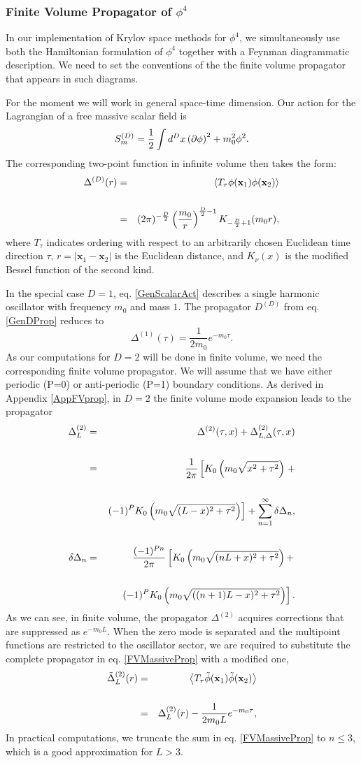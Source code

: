 \documentclass[twocolumn,secnumarabic,amssymb, nobibnotes, aps, prd]{revtex4-2}
\newcommand{\be}{\begin{equation}}
\newcommand{\ee}{\end{equation}}
\newcommand{\bea}{\begin{eqnarray}}
\newcommand{\eea}{\end{eqnarray}}
\begin{document}
\subsubsection{Finite Volume Propagator of $\phi^4$}
In our implementation of Krylov space methods for $\phi^4$, we simultaneously use both the Hamiltonian formulation of $\phi^4$ together with a Feynman diagrammatic description.  We need to set the conventions of the the finite volume propagator that appears in such diagrams.

For the moment we will work in general space-time dimension.  
Our action for the Lagrangian of a free massive scalar field is
\be
S_m^{(D)}=\frac{1}{2}\intop d^D x \left(\partial\phi\right)^2+m_0^2\phi^2. \label{GenScalarAct}
\ee
The corresponding two-point function in infinite volume then takes the form:
\bea
\Delta^{(D)}(r)&=&\left\langle T_{\tau}\phi(\mathbf{x}_1)\phi(\mathbf{x}_2)\right\rangle\cr\cr\label{GenDProp}
&=&(2\pi)^{-\frac{D}{2}}\left(\frac{m_0}{r}\right)^{\frac{D}{2}-1}K_{-\frac{D}{2}+1}(m_0r),
\eea
where $T_\tau$ indicates ordering with respect to an arbitrarily chosen Euclidean time direction $\tau$, $r=|\mathbf{x}_1-\mathbf{x}_2|$ is the Euclidean distance, and $K_\nu(x)$ is the modified Bessel function of the second kind.

In the special case $D=1$, eq. \eqref{GenScalarAct} describes a single harmonic oscillator with frequency $m_0$ and mass $1$. The propagator $D^{(D)}$ from eq. \eqref{GenDProp} reduces to
\be
\Delta^{(1)}(\tau)=\frac{1}{2m_0}e^{-m_0 \tau}.
\ee
As our computations for $D=2$ will be done in finite volume, we need the corresponding finite volume propagator.  We will assume that we have either periodic (P=0) or anti-periodic (P=1) boundary conditions.  As derived in Appendix \ref{AppFVprop}, in $D=2$ the finite volume mode expansion leads to the propagator
\bea
\Delta^{(2)}_L&=&\Delta^{(2)}(\tau,x)+\Delta^{(2)}_{L,\Delta}(\tau,x)\label{FVMassiveProp}\cr\cr
&=&\frac{1}{2\pi}\left[K_0\left(m_0\sqrt{x^2+\tau^2}\right)\right.+\cr\cr
& &\left.(-1)^{P}K_0\left(m_0\sqrt{(L-x)^2+\tau^2}\right)\right]+\sum_{n=1}^{\infty}\delta \Delta_n,\cr\cr
\delta \Delta_n&=&\frac{(-1)^{Pn}}{2\pi}\left[K_0\left(m_0\sqrt{(nL+x)^2+\tau^2}\right)+\right.\cr\cr
& &\left.(-1)^{P}K_0\left(m_0\sqrt{((n+1)L-x)^2+\tau^2}\right)\right].
\eea
As we can see, in finite volume, the propagator $\Delta^{(2)}$ acquires corrections that are suppressed as $e^{-m_0L}$.
When the zero mode is separated and the multipoint functions are restricted to the oscillator sector, we are required to substitute the complete propagator in eq. \eqref{FVMassiveProp} with a modified one,
\bea
\tilde{\Delta}^{(2)}_L(r)&=&\left\langle T_{\tau}\tilde{\phi}(\mathbf{x}_1)\tilde{\phi}(\mathbf{x}_2)\right\rangle\cr\cr
&=&\Delta^{(2)}_{L}(r)-\frac{1}{2m_0L}e^{-m_0\tau}, \label{ModFVProp}
\eea
In practical computations, we truncate the sum in eq. \eqref{FVMassiveProp} to $n\leq3$, which is a good approximation for $L>3$.
\end{document}
